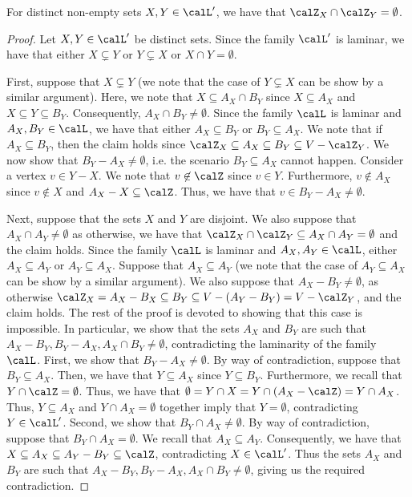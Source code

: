 \begin{claim}\label{claim:Laminar-family-projection:Z_X-Z_Y-disjoint}
    For distinct non-empty sets $X, Y \in \calL'$, we have that $\calZ_{X}\cap\calZ_{Y} = \emptyset$.
\end{claim}
\begin{proof}
     Let $X, Y \in\calL'$ be distinct sets. Since the family $\calL'$ is laminar, we have that either $X \subsetneq Y$ or $Y\subsetneq X$ or $X\cap Y = \emptyset$.

    First, suppose that $X \subsetneq Y$ (we note that the case of $Y\subsetneq X$ can be show by a similar argument). Here, we note that $X \subseteq A_X \cap B_Y $ since $X \subseteq A_X$ and $X \subseteq Y \subseteq B_Y$. Consequently, $A_X\cap B_Y\neq \emptyset$. 
    Since the family $\calL$ is laminar and $A_X, B_Y \in \calL$, we have that either $A_X \subseteq B_Y$ or $B_Y \subseteq A_X$. We note that if $A_X \subseteq B_Y$, then the claim holds since $\calZ_X \subseteq A_X \subseteq B_{Y} \subseteq V - \calZ_Y$.
    We now show that $B_Y - A_X \not = \emptyset$, i.e. the scenario $B_Y \subseteq A_X$ cannot happen. 
    Consider a vertex $v \in Y - X$. We note that 
    $v \not \in \calZ$
    since $v \in Y$. Furthermore, $v \not \in A_X$ since $v \not \in X$ and $A_X - X \subseteq \calZ$.
    Thus, we have that $v \in B_Y - A_X \not = \emptyset$.

    Next, suppose that the sets $X$ and $Y$ are disjoint. We also suppose that $A_X \cap A_Y \not = \emptyset$ as otherwise, we have that $\calZ_X \cap \calZ_Y \subseteq A_X \cap A_Y = \emptyset$ and the claim holds. Since the family $\calL$ is laminar and $A_X, A_Y \in \calL$, either $A_X \subseteq A_Y$ or $A_Y \subseteq A_X$. Suppose that  $A_X \subseteq A_Y$ (we note that the case of $A_Y \subseteq A_X$ can be show by a similar argument).
    We also suppose that $A_X - B_Y \not = \emptyset$, as otherwise $\calZ_X = A_X - B_X \subseteq B_Y \subseteq V - (A_Y - B_Y) = V - \calZ_Y$, and the claim holds. 
    The rest of the proof is devoted to showing that this case is impossible. In particular, we show that
    the sets $A_X$ and $B_Y$ are such that $A_X-B_Y, B_Y-A_X, A_X\cap B_Y\neq \emptyset$, contradicting the laminarity of the family $\calL$. First, we show that $B_Y - A_X \not = \emptyset$. By way of contradiction, suppose that $B_Y \subseteq A_X$. Then, we have that $Y \subseteq A_X$ since $Y \subseteq B_Y$. Furthermore,  we recall that $Y\cap \calZ = \emptyset$. Thus, we have that $\emptyset = Y \cap X = Y \cap (A_X - \calZ) = Y\cap A_X$. Thus, $Y\subseteq A_X$ and $Y\cap A_X=\emptyset$ together imply that $Y = \emptyset$, contradicting $Y \in \calL'$. Second, we show that $B_Y\cap A_X \not = \emptyset$. By way of contradiction, suppose that $B_Y\cap A_X = \emptyset$. We recall that $A_X\subseteq A_Y$. Consequently, we have that $X \subseteq A_X \subseteq A_Y - B_Y \subseteq \calZ$, contradicting $X \in \calL'$. Thus the sets $A_X$ and $B_Y$ are such that $A_X-B_Y, B_Y-A_X, A_X\cap B_Y\neq \emptyset$, giving us the required contradiction.
\end{proof}
